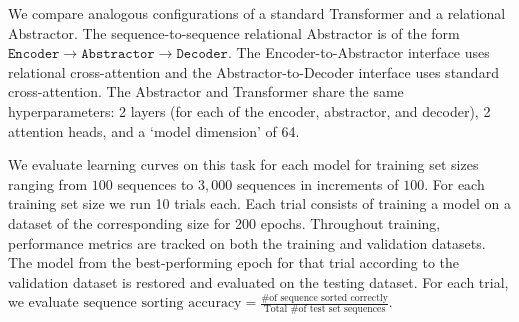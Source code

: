  We compare analogous configurations of a standard Transformer and a relational Abstractor. The sequence-to-sequence relational Abstractor is of the form $\texttt{Encoder} \to \texttt{Abstractor} \to \texttt{Decoder}$. The Encoder-to-Abstractor interface uses relational cross-attention and the Abstractor-to-Decoder interface uses standard cross-attention. The Abstractor and Transformer share the same hyperparameters: 2 layers (for each of the encoder, abstractor, and decoder), 2 attention heads, and a `model dimension' of 64.

 We evaluate learning curves on this task for each model for training set
sizes ranging from $
100$ sequences to $3,000$ sequences in increments of $100$. For each training set size we run 10 trials each. Each trial consists of training a model on a dataset of the corresponding size for 200 epochs. Throughout training, performance metrics are tracked on both the training and validation datasets. The model from the best-performing epoch for that trial according to the validation dataset is restored and evaluated on the testing dataset. For each trial, we evaluate $\text{sequence sorting accuracy} = \frac{\text{\# of sequence sorted correctly}}{\text{Total \# of test set sequences}}$.

